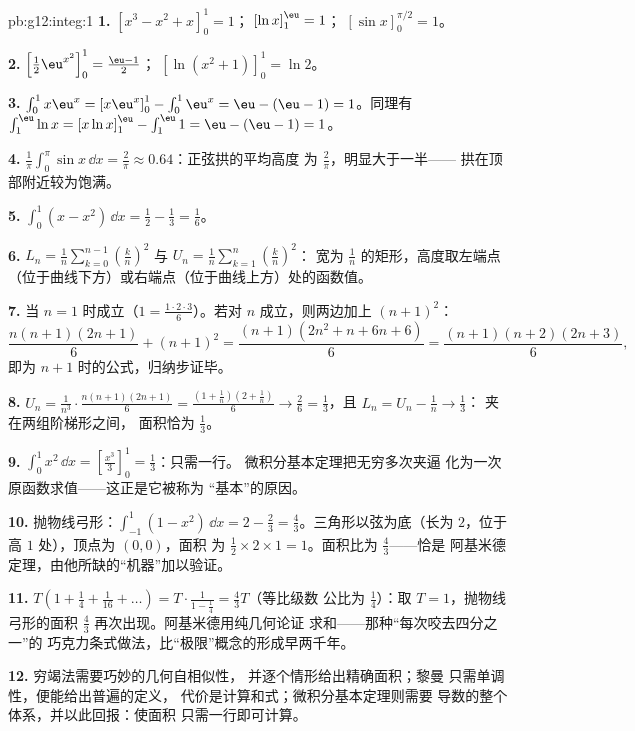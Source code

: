 \begin{solution}{pb:g12:integ:1}
\textbf{1.} $\left[x^3 - x^2 + x\right]_0^1 = 1$；\quad
$\left[\ln x\right]_1^{\eu} = 1$；\quad
$\left[\sin x\right]_0^{\pi/2} = 1$。

\textbf{2.} $\left[\frac12 \eu^{x^2}\right]_0^1 =
\frac{\eu - 1}{2}$；\quad
$\left[\ln(x^2 + 1)\right]_0^1 = \ln 2$。

\textbf{3.} $\int_0^1 x\eu^x = \left[x\eu^x\right]_0^1 -
\int_0^1 \eu^x = \eu - (\eu - 1) = 1$。同理有
$\int_1^{\eu} \ln x = \left[x\ln x\right]_1^{\eu} -
\int_1^{\eu} 1 = \eu - (\eu - 1) = 1$。

\textbf{4.} $\frac{1}{\pi}\int_0^\pi \sin x\,\dd x =
\frac{2}{\pi} \approx 0.64$：正弦拱的平均高度
为 $\frac2\pi$，明显大于一半——
拱在顶部附近较为饱满。

\textbf{5.} $\int_0^1 (x - x^2)\,\dd x = \frac12 - \frac13 =
\frac16$。

\textbf{6.} $L_n = \frac1n \sum_{k=0}^{n-1}
\left(\frac kn\right)^2$ 与
$U_n = \frac1n \sum_{k=1}^{n} \left(\frac kn\right)^2$：
宽为 $\frac1n$ 的矩形，高度取左端点
（位于曲线下方）或右端点（位于曲线上方）处的函数值。

\textbf{7.} 当 $n = 1$ 时成立（$1 = \frac{1 \cdot 2 \cdot
3}{6}$）。若对 $n$ 成立，则两边加上 $(n+1)^2$：
\[
\frac{n(n+1)(2n+1)}{6} + (n+1)^2
= \frac{(n+1)\left(2n^2 + n + 6n + 6\right)}{6}
= \frac{(n+1)(n+2)(2n+3)}{6},
\]
即为 $n + 1$ 时的公式，归纳步证毕。

\textbf{8.} $U_n = \frac{1}{n^3} \cdot
\frac{n(n+1)(2n+1)}{6} = \frac{(1 + \frac1n)(2 + \frac1n)}{6}
\to \frac26 = \frac13$，且 $L_n = U_n - \frac1n \to \frac13$：
夹在两组阶梯形之间，
面积恰为 $\frac13$。

\textbf{9.} $\int_0^1 x^2\,\dd x =
\left[\frac{x^3}{3}\right]_0^1 = \frac13$：只需一行。
微积分基本定理把无穷多次夹逼
化为一次原函数求值——这正是它被称为
“基本”的原因。

\textbf{10.} 抛物线弓形：$\int_{-1}^{1}(1 - x^2)\,\dd x =
2 - \frac23 = \frac43$。三角形以弦为底（长为
$2$，位于高 $1$ 处），顶点为 $(0,0)$，面积
为 $\frac12 \times 2 \times 1 = 1$。面积比为 $\frac43$——恰是
阿基米德定理，由他所缺的“机器”加以验证。

\textbf{11.} $T\left(1 + \frac14 + \frac{1}{16} + \dots\right)
= T \cdot \frac{1}{1 - \frac14} = \frac43 T$（等比级数
公比为 $\frac14$）：取 $T = 1$，抛物线弓形的面积
$\frac43$ 再次出现。阿基米德用纯几何论证
求和——那种“每次咬去四分之一”的
巧克力条式做法，比“极限”概念的形成早两千年。

\textbf{12.} 穷竭法需要巧妙的几何自相似性，
并逐个情形给出精确面积；黎曼
只需单调性，便能给出普遍的定义，
代价是计算和式；微积分基本定理则需要
导数的整个体系，并以此回报：使面积
只需一行即可计算。


\end{solution}
